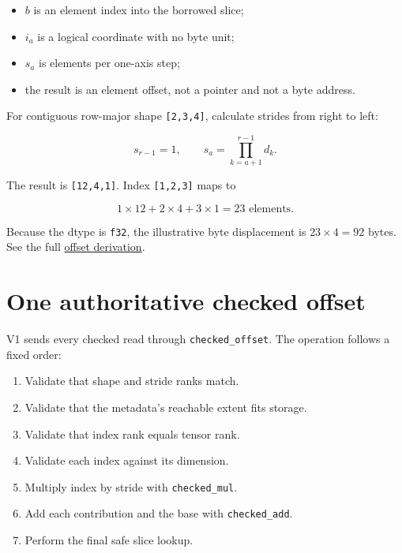 \begin{itemize}
\tightlist
\item
  \(b\) is an element index into the borrowed slice;
\item
  \(i_a\) is a logical coordinate with no byte unit;
\item
  \(s_a\) is elements per one-axis step;
\item
  the result is an element offset, not a pointer and not a byte address.
\end{itemize}

For contiguous row-major shape \texttt{{[}2,3,4{]}}, calculate strides
from right to left:

\begin{equation}
s_{r-1}=1,
\qquad
s_a=\prod_{k=a+1}^{r-1}d_k.
\end{equation}

The result is \texttt{{[}12,4,1{]}}. Index \texttt{{[}1,2,3{]}} maps to

\begin{equation}
1\times12 + 2\times4 + 3\times1 = 23\text{ elements}.
\end{equation}

Because the dtype is \texttt{f32}, the illustrative byte displacement is
\(23\times4=92\) bytes. See the full
\href{https://github.com/hermonai/inside-the-llm-engine/blob/astra-visual-rewrite/diagrams/tensor/row-major-offsets.txt}{offset
derivation}.

\section{One authoritative checked
offset}\label{one-authoritative-checked-offset}

V1 sends every checked read through \texttt{checked\_offset}. The
operation follows a fixed order:

\begin{enumerate}
\def\labelenumi{\arabic{enumi}.}
\tightlist
\item
  Validate that shape and stride ranks match.
\item
  Validate that the metadata's reachable extent fits storage.
\item
  Validate that index rank equals tensor rank.
\item
  Validate each index against its dimension.
\item
  Multiply index by stride with \texttt{checked\_mul}.
\item
  Add each contribution and the base with \texttt{checked\_add}.
\item
  Perform the final safe slice lookup.
\end{enumerate}

